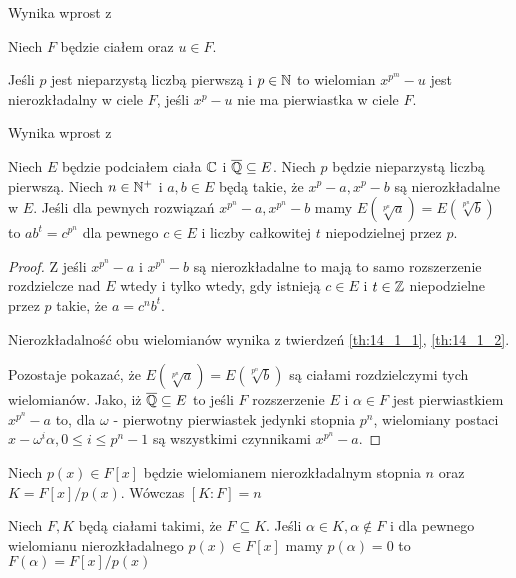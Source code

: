   Wynika wprost z \cite[Twierdzenie 14.1.1]{rom06}

\begin{theorem}
  Niech $F$ będzie ciałem oraz $u \in F$.

  Jeśli $p$ jest nieparzystą liczbą pierwszą i $p \in \mathbb{N}$ to wielomian
  $x^{p^m} - u$ jest nierozkładalny w ciele $F$, jeśli
  $x^p - u$ nie ma pierwiastka w ciele $F$.
  \label{th:14_1_2}
\end{theorem}

  Wynika wprost z \cite[Twierdzenie 14.1.2]{rom06}

\begin{lemma}
  Niech $E$ będzie podciałem ciała $\mathbb{C}$ i $\overline{\mathbb{Q}} \subseteq E$.
  Niech $p$ będzie nieparzystą liczbą pierwszą.
  Niech $n \in \mathbb{N}^+$ i $a, b \in E$ będą takie, że $x^p - a, x^p - b$ są
  nierozkładalne w $E$.
  Jeśli dla pewnych rozwiązań $x^{p^n} - a, x^{p^n} -b$ mamy
  $E\left(\! \sqrt[p^n]{a}\right) = E\left(\! \sqrt[p^n]{b}\right)$ to $ab^t =
  c^{p^n}$ dla pewnego $c \in E$ i liczby całkowitej $t$ niepodzielnej przez
  $p$.
  \label{lem:associated_extensions}
\end{lemma}
\begin{proof}
  Z \cite[Twierdzenie 14.2.8]{rom06} jeśli $x^{p^n} - a$ i $x^{p^n} - b$ są
  nierozkładalne to mają to samo rozszerzenie rozdzielcze nad $E$ wtedy i tylko
  wtedy, gdy istnieją $c \in E$ i $t \in \mathbb{Z}$ niepodzielne przez $p$ takie, że
  $a = c^nb^t$.

  Nierozkładalność obu wielomianów wynika z twierdzeń \ref{th:14_1_1},
  \ref{th:14_1_2}.

  Pozostaje pokazać, że
  $E\left(\! \sqrt[p^n]{a}\right) = E\left(\! \sqrt[p^n]{b}\right)$ są ciałami
  rozdzielczymi tych wielomianów.
  Jako, iż $\overline{\mathbb{Q}} \subseteq E$ to jeśli $F$ rozszerzenie $E$ i $\alpha
  \in F$ jest pierwiastkiem $x^{p^n} -a$ to, dla $\omega$ - pierwotny
  pierwiastek jedynki stopnia $p^n$, wielomiany postaci $x - \omega^i \alpha, 0
  \leq i \leq p^n - 1$ są wszystkimi czynnikami $x^{p^n} - a$.
\end{proof}

\begin{theorem}
  Niech $p(x) \in F[x]$ będzie wielomianem nierozkładalnym stopnia $n$ oraz $K =
  F[x]/p(x)$.
  Wówczas $[K:F] = n$
  \label{th:13_1_6}
\end{theorem}

  \cite[Twierdzenie 13.1.6]{dum04}

\begin{theorem}
  Niech $F, K$ będą ciałami takimi, że $F \subseteq K$.
  Jeśli $\alpha \in K, \alpha \not \in F$ i dla pewnego wielomianu
  nierozkładalnego $p(x) \in F[x]$ mamy $p(\alpha) = 0$ to $F(\alpha) =
  F[x]/p(x)$
  \label{th:13_1_4}
\end{theorem}

